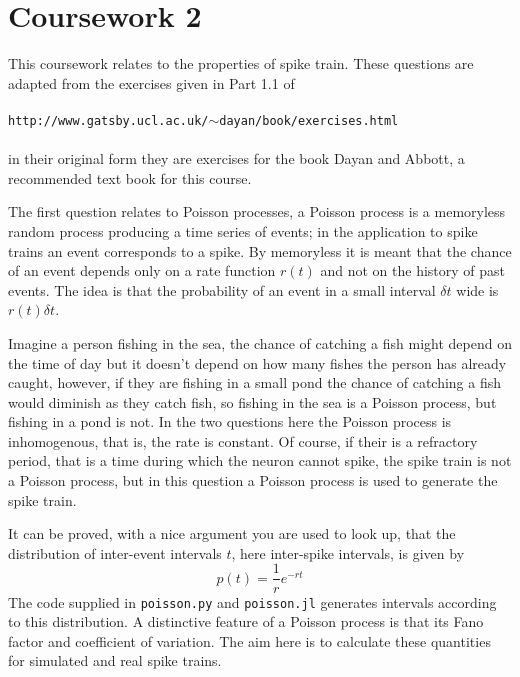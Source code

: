 \documentclass[12pt]{article}
\begin{document}
\section*{Coursework 2}

This coursework relates to the properties of spike train. These
questions are adapted from the exercises given in Part 1.1 of\\
\\
\texttt{http://www.gatsby.ucl.ac.uk/$\sim$dayan/book/exercises.html}\\ 
\\
in their original form they are exercises for the book Dayan and Abbott,
a recommended text book for this course.

The first question relates to Poisson processes, a Poisson process
is a memoryless random process producing a time series of events; in
the application to spike trains an event corresponds to a spike. By
memoryless it is meant that the chance of an event depends only on a
rate function $r(t)$ and not on the history of past events. The idea
is that the probability of an event in a small interval $\delta t$ wide is $r(t)\delta t$.

Imagine a person fishing in the sea, the chance of catching a fish
might depend on the time of day but it doesn't depend on how many
fishes the person has already caught, however, if they are fishing in
a small pond the chance of catching a fish would diminish as they
catch fish, so fishing in the sea is a Poisson process, but fishing in
a pond is not. In the two questions here the Poisson process is
inhomogenous, that is, the rate is constant. Of course, if their is a
refractory period, that is a time during which the neuron cannot
spike, the spike train is not a Poisson process, but in this question
a Poisson process is used to generate the spike train.

It can be proved, with a nice argument you are used to look up, that
the distribution of inter-event intervals $t$, here inter-spike intervals,
is given by
\begin{equation}
p(t)=\frac{1}{r}e^{-rt}
\end{equation}
The code supplied in \texttt{poisson.py} and \texttt{poisson.jl}
generates intervals according to this distribution. A distinctive
feature of a Poisson process is that its Fano factor and coefficient
of variation. The aim here is to calculate these quantities for
simulated and real spike trains.
\end{document}
